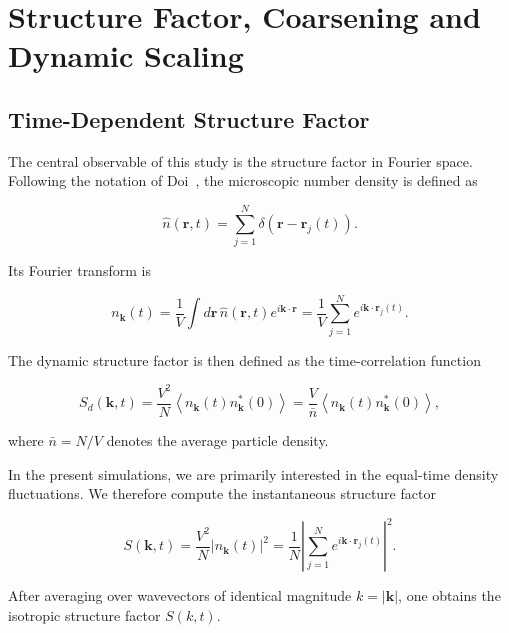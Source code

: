 \documentclass[11pt,a4paper]{article}
\begin{document}
\section{Structure Factor, Coarsening and Dynamic Scaling}

\subsection{Time-Dependent Structure Factor}

The central observable of this study is the structure factor in Fourier space. Following the notation of Doi~\cite{doi_soft}, the microscopic number density is defined as

\begin{equation}
\hat n(\mathbf r,t)
=
\sum_{j=1}^{N}
\delta\!\left(\mathbf r-\mathbf r_j(t)\right).
\end{equation}

Its Fourier transform is

\begin{equation}
n_{\mathbf k}(t)
=
\frac{1}{V}
\int d\mathbf r\,
\hat n(\mathbf r,t)
e^{i\mathbf k\cdot\mathbf r}
=
\frac{1}{V}
\sum_{j=1}^{N}
e^{i\mathbf k\cdot\mathbf r_j(t)}.
\label{eq:nk}
\end{equation}

The dynamic structure factor is then defined as the time-correlation function

\begin{equation}
S_d(\mathbf k,t)
=
\frac{V^2}{N}
\left\langle
n_{\mathbf k}(t)
n_{\mathbf k}^{*}(0)
\right\rangle
=
\frac{V}{\bar n}
\left\langle
n_{\mathbf k}(t)
n_{\mathbf k}^{*}(0)
\right\rangle ,
\label{eq:Sd}
\end{equation}

where $\bar n = N/V$ denotes the average particle density.

In the present simulations, we are primarily interested in the equal-time density fluctuations. We therefore compute the instantaneous structure factor

\begin{equation}
S(\mathbf k,t)
=
\frac{V^2}{N}
\left|
n_{\mathbf k}(t)
\right|^2
=
\frac{1}{N}
\left|
\sum_{j=1}^{N}
e^{i\mathbf k\cdot\mathbf r_j(t)}
\right|^2 .
\label{eq:structure_factor}
\end{equation}

After averaging over wavevectors of identical magnitude
$k = |\mathbf k|$, one obtains the isotropic structure factor
$S(k,t)$.
\end{document}
